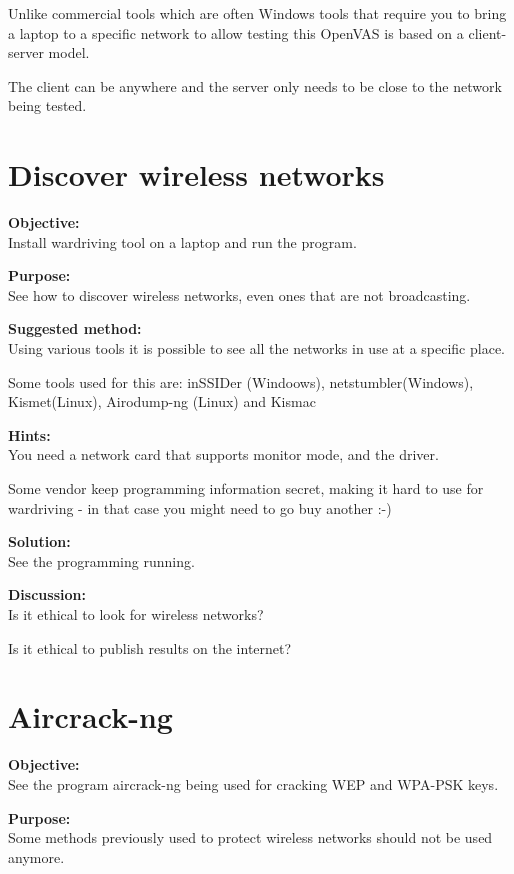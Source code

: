 \documentclass[a4paper,11pt,notitlepage]{report}
\begin{document}
Unlike commercial tools which are often Windows tools that require you to bring a laptop
to a specific network to allow testing this OpenVAS is based on a client-server model.

The client can be anywhere and the server only needs to be close to the network being tested.

\chapter{Discover wireless networks}
\label{ex:wardriving-windows}

{\bf Objective:}\\
Install wardriving tool on a laptop and run the program.

{\bf Purpose:}\\
See how to discover wireless networks, even ones that are not broadcasting.

{\bf Suggested method:}\\
Using various tools it is possible to see all the networks in use at a specific
place.

Some tools used for this are: inSSIDer (Windoows), netstumbler(Windows), Kismet(Linux), Airodump-ng (Linux) and Kismac

{\bf Hints:}\\
You need a network card that supports monitor mode, and the driver.

Some vendor keep programming information secret, making it hard to use for wardriving - in that case you might need to go buy another :-)


{\bf Solution:}\\
See the programming running.

{\bf Discussion:}\\
Is it ethical to look for wireless networks?

Is it ethical to publish results on the internet?


\chapter{Aircrack-ng}
\label{ex:aircrack-ng}

{\bf Objective:}\\
See the program aircrack-ng being used for cracking WEP and WPA-PSK keys.

{\bf Purpose:}\\
Some methods previously used to protect wireless networks should not be used anymore.
\end{document}
